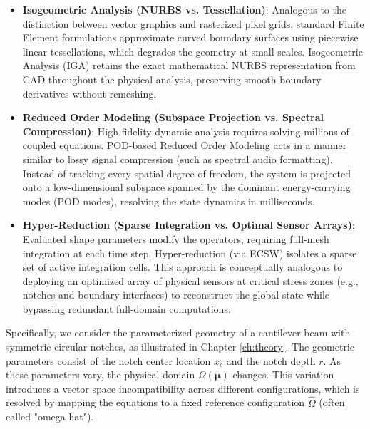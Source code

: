\begin{itemize}
    \item \textbf{Isogeometric Analysis (NURBS vs. Tessellation)}: Analogous to the distinction between vector graphics and rasterized pixel grids, standard Finite Element formulations approximate curved boundary surfaces using piecewise linear tessellations, which degrades the geometry at small scales. Isogeometric Analysis (IGA) retains the exact mathematical NURBS representation from CAD throughout the physical analysis, preserving smooth boundary derivatives without remeshing.
    \item \textbf{Reduced Order Modeling (Subspace Projection vs. Spectral Compression)}: High-fidelity dynamic analysis requires solving millions of coupled equations. POD-based Reduced Order Modeling acts in a manner similar to lossy signal compression (such as spectral audio formatting). Instead of tracking every spatial degree of freedom, the system is projected onto a low-dimensional subspace spanned by the dominant energy-carrying modes (POD modes), resolving the state dynamics in milliseconds.
    \item \textbf{Hyper-Reduction (Sparse Integration vs. Optimal Sensor Arrays)}: Evaluated shape parameters modify the operators, requiring full-mesh integration at each time step. Hyper-reduction (via ECSW) isolates a sparse set of active integration cells. This approach is conceptually analogous to deploying an optimized array of physical sensors at critical stress zones (e.g., notches and boundary interfaces) to reconstruct the global state while bypassing redundant full-domain computations.
\end{itemize}

Specifically, we consider the parameterized geometry of a cantilever beam with symmetric circular notches, as illustrated in Chapter \ref{ch:theory}. The geometric parameters consist of the notch center location $x_c$ and the notch depth $r$. As these parameters vary, the physical domain $\Omega(\boldsymbol{\mu})$ changes. This variation introduces a vector space incompatibility across different configurations, which is resolved by mapping the equations to a fixed reference configuration $\hat{\Omega}$ (often called "omega hat").

